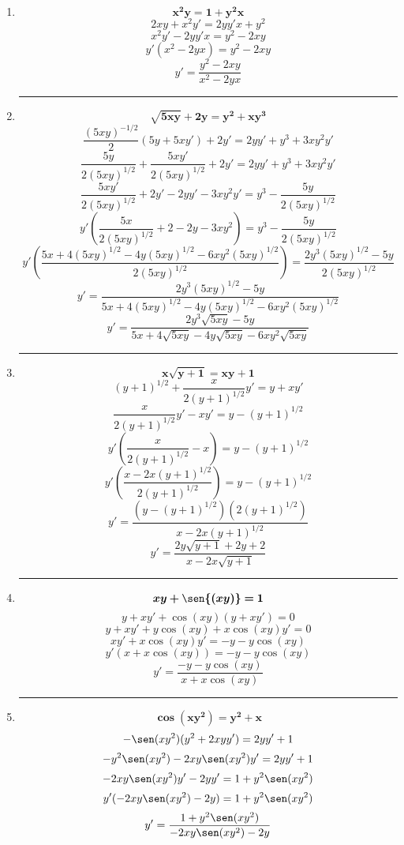 \documentclass[12pt]{article}
\begin{document}
\begin{enumerate}[label=\textbf{\arabic*)}]
            \hrule\item \[\bm{x^2 y = 1 + y^2 x}\]
                \[2xy + x^2y' = 2yy'x + y^2\] 
                \[x^2y' - 2yy'x = y^2 - 2xy\] 
                \[y'(x^2 - 2yx) = y^2 - 2xy\]
                \[y' = \frac{y^2 - 2xy}{x^2 - 2yx}\]  

            \hrule\item \[\bm{\sqrt{5xy} + 2y = y^2 + xy^3}\]
                \[\frac{(5xy)^{-1/2}}{2} (5y + 5xy') + 2y' = 2yy' + y^3 + 3xy^2y'\]
                \[\frac{5y}{2(5xy)^{1/2}} + \frac{5xy'}{2(5xy)^{1/2}}  + 2y' = 2yy' + y^3 + 3xy^2y'\] 
                \[\frac{5xy'}{2(5xy)^{1/2}} + 2y' - 2yy' - 3xy^2y' = y^3 - \frac{5y}{2(5xy)^{1/2}}\] 
                \[y' \left(\frac{5x}{2(5xy)^{1/2}} + 2 - 2y - 3xy^2\right) = y^3 - \frac{5y}{2(5xy)^{1/2}}\]
                \[y' \left(\frac{5x + 4(5xy)^{1/2} - 4y(5xy)^{1/2} - 6xy^2(5xy)^{1/2}}{2(5xy)^{1/2}}\right) = \frac{2y^3(5xy)^{1/2} - 5y}{2(5xy)^{1/2}}\]  
                \[y' = \frac{2y^3(5xy)^{1/2} - 5y}{5x + 4(5xy)^{1/2} - 4y(5xy)^{1/2} - 6xy^2(5xy)^{1/2}}\]  
                \[y' = \frac{2y^3\sqrt{5xy} - 5y}{5x + 4\sqrt{5xy} - 4y\sqrt{5xy} - 6xy^2\sqrt{5xy}}\]  

            \hrule\item \[\bm{x\sqrt{y + 1} = xy + 1}\]
                \[(y + 1)^{1/2} + \frac{x}{2(y + 1)^{1/2}} y' = y + xy'\] 
                \[\frac{x}{2(y + 1)^{1/2}} y' - xy' = y - (y + 1)^{1/2}\]
                \[y'\left(\frac{x}{2(y + 1)^{1/2}} - x\right) = y - (y + 1)^{1/2}\]  
                \[y'\left(\frac{x - 2x(y + 1)^{1/2}}{2(y + 1)^{1/2}}\right) = y - (y + 1)^{1/2}\]  
                \[y' = \frac{(y - (y + 1)^{1/2})(2(y + 1)^{1/2})}{x - 2x(y + 1)^{1/2}}\]
                \[y' = \frac{2y\sqrt{y + 1} + 2y + 2}{x - 2x\sqrt{y + 1}}\]

            \hrule\item \[\bm{xy + \sen{(xy)} = 1}\]
                \[y + xy' + \cos(xy)(y + xy') = 0\] 
                \[y + xy' + y\cos(xy) + x\cos(xy)y' = 0\] 
                \[xy' + x\cos(xy)y' = - y -  y\cos(xy)\] 
                \[y'(x + x\cos(xy)) = - y -  y\cos(xy)\]
                \[y' = \frac{- y -  y\cos(xy)}{x + x\cos(xy)}\]

            \hrule\item \[\bm{\cos{(xy^2)} = y^2 + x}\]
                \[- \sen(xy^2)(y^2 + 2xyy') = 2yy' + 1\] 
                \[- y^2\sen(xy^2) - 2xy\sen(xy^2)y' = 2yy' + 1\] 
                \[- 2xy\sen(xy^2)y' - 2yy' = 1 + y^2\sen(xy^2) \] 
                \[y'(- 2xy\sen(xy^2) - 2y) = 1 + y^2\sen(xy^2) \] 
                \[y' = \frac{1 + y^2\sen(xy^2)}{- 2xy\sen(xy^2) - 2y} \] 
                
            
        \end{enumerate}
\end{document}
